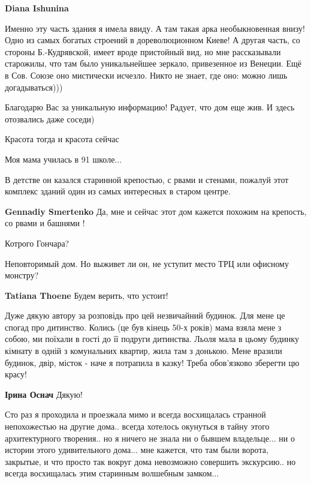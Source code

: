 \begin{itemize}
\begin{itemize}
\begin{itemize}
\textbf{Diana Ishunina} 

Именно эту часть здания я имела ввиду. А там такая арка необыкновенная внизу!
Одно из самых богатых строений в дореволюционном Киеве! А другая часть, со
стороны Б.-Кудрявской, имеет вроде пристойный вид, но мне рассказывали
старожилы, что там было уникальнейшее зеркало, привезенное из Венеции. Ещё в
Сов. Союзе оно мистически исчезло. Никто не знает, где оно: можно лишь
догадываться)))

\end{itemize} %

\end{itemize} %


Благодарю Вас за уникальную информацию!
Радует, что дом еще жив. И здесь отозвались даже соседи)

Красота тогда и красота сейчас

Моя мама училась в 91 школе...


В детстве он казался старинной крепостью, с рвами и стенами, пожалуй этот
комплекс зданий один из самых интересных в старом центре.


\textbf{Gennadiy Smertenko} Да, мне и сейчас этот дом кажется похожим на крепость, со рвами и башнями !

Котрого Гончара?

Неповторимый дом. Но выживет ли он, не уступит место ТРЦ или офисному монстру?

\textbf{Tatiana Thoene} Будем верить, что устоит!


Дуже дякую автору за розповідь про цей незвичайний будинок. Для мене це спогад
про дитинство. Колись (це був кінець 50-х років) мама взяла мене з собою, ми
поїхали в гості до її подруги дитинства. Льоля мала в цьому будинку кімнату в
одній з комунальних квартир, жила там з донькою. Мене вразили будинок, двір,
місток - наче я потрапила в казку! Треба обов'язково зберегти цю красу!

\textbf{Ірина Оснач} Дякую!


Сто раз я проходила и проезжала мимо и всегда восхищалась странной непохожестью
на другие дома.. всегда хотелось окунуться в тайну этого архитектурного
творения.. но я ничего не знала ни о бывшем владельце... ни о истории этого
удивительного дома... мне кажется, что там были ворота, закрытые, и что просто
так вокруг дома невозможно совершить экскурсию.. но всегда восхищалась этим
старинным волшебным замком...



\end{itemize}
